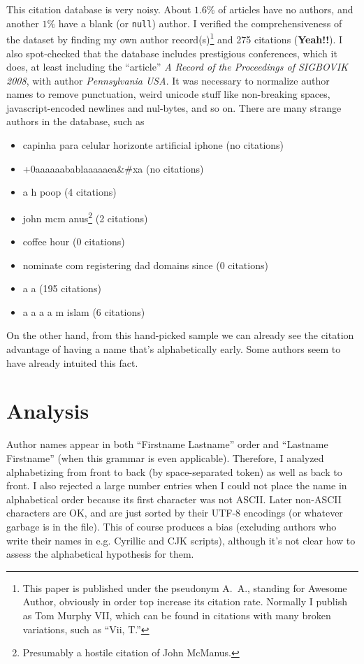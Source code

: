 \documentclass[twocolumn]{article}
\begin{document}
This citation database is very noisy. About $1.6\%$ of articles have
no authors, and another $1\%$ have a blank (or {\tt null}) author. I
verified the comprehensiveness of the dataset by finding my own author
record(s)\footnote{This paper is published under the pseudonym A.~A.,
  standing for Awesome Author, obviously in order top increase its
  citation rate. Normally I publish as Tom Murphy VII, which can be
  found in citations with many broken variations, such as ``Vii, T.''}
and 275 citations ({\bf Yeah!!}). I also spot-checked that the database
includes prestigious conferences, which it does, at least including
the ``article'' {\em A Record of the Proceedings of SIGBOVIK 2008},
with author {\em Pennsylvania USA}. It was necessary to normalize
author names to remove punctuation, weird unicode stuff like non-breaking
spaces, javascript-encoded newlines and nul-bytes, and so on. There
are many strange authors in the database, such as
\begin{itemize}
\item capinha para celular horizonte artificial iphone \quad(no citations)
\item +0aaaaaabablaaaaaea\&\#xa \quad(no citations)
\item a h poop \quad(4 citations)
\item john mcm anus\footnote{Presumably a hostile citation of John McManus.} \quad(2 citations)
\item coffee hour \quad(0 citations)
\item nominate com registering dad domains since \quad(0 citations)
\item a a \quad(195 citations)
\item a a a a m islam \quad(6 citations)
\end{itemize}

On the other hand, from this hand-picked sample we can already see the
citation advantage of having a name that's alphabetically early. Some
authors seem to have already intuited this fact.

\section{Analysis}

Author names appear in both ``Firstname Lastname'' order and
``Lastname Firstname'' (when this grammar is even applicable).
Therefore, I analyzed alphabetizing from front to back (by
space-separated token) as well as back to front. I also rejected a
large number entries when I could not place the name in alphabetical
order because its first character was not ASCII. Later non-ASCII
characters are OK, and are just sorted by their UTF-8 encodings (or
whatever garbage is in the file). This of course produces a bias
(excluding authors who write their names in e.g. Cyrillic and CJK
scripts), although it's not clear how to assess the alphabetical
hypothesis for them.
\end{document}
